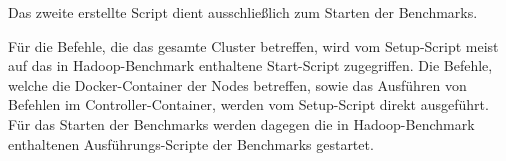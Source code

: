 Das zweite erstellte Script dient ausschließlich zum Starten der Benchmarks.

Für die Befehle, die das gesamte Cluster betreffen, wird vom Setup-Script meist auf das in Hadoop-Benchmark enthaltene Start-Script zugegriffen. Die Befehle, welche die Docker-Container der Nodes betreffen, sowie das Ausführen von Befehlen im Controller-Container, werden vom Setup-Script direkt ausgeführt. Für das Starten der Benchmarks werden dagegen die in Hadoop-Benchmark enthaltenen Ausführungs-Scripte der Benchmarks gestartet.
